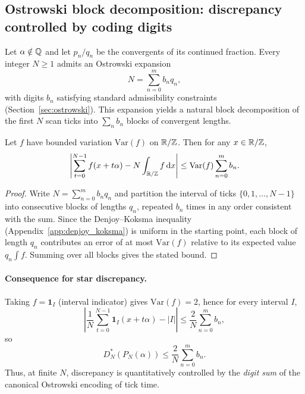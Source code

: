 \subsection{Ostrowski block decomposition: discrepancy controlled by coding digits}
\label{app:ostrowski_discrepancy}

Let $\alpha\notin\mathbb{Q}$ and let $p_n/q_n$ be the convergents of its continued fraction. Every integer $N\ge 1$ admits an Ostrowski expansion
\begin{equation}
N=\sum_{n=0}^{m} b_n q_n,
\end{equation}
with digits $b_n$ satisfying standard admissibility constraints (Section~\ref{sec:ostrowski}). This expansion yields a natural block decomposition of the first $N$ scan ticks into $\sum_n b_n$ blocks of convergent lengths.

\begin{proposition}
\label{prop:ostrowski_birkhoff_bound}
Let $f$ have bounded variation $\mathrm{Var}(f)$ on $\mathbb{R}/\mathbb{Z}$. Then for any $x\in\mathbb{R}/\mathbb{Z}$,
\begin{equation}
\left|\sum_{t=0}^{N-1} f(x+t\alpha) - N\int_{\mathbb{R}/\mathbb{Z}} f\,\mathrm{d} x\right|
\le \mathrm{Var}(f)\sum_{n=0}^{m} b_n.
\end{equation}
\end{proposition}

\begin{proof}
Write $N=\sum_{n=0}^{m} b_n q_n$ and partition the interval of ticks $\{0,1,\ldots,N-1\}$ into consecutive blocks of lengths $q_n$, repeated $b_n$ times in any order consistent with the sum.
Since the Denjoy--Koksma inequality (Appendix~\ref{app:denjoy_koksma}) is uniform in the starting point, each block of length $q_n$ contributes an error of at most $\mathrm{Var}(f)$ relative to its expected value $q_n\int f$.
Summing over all blocks gives the stated bound.
\end{proof}

\paragraph{Consequence for star discrepancy.}
Taking $f=\mathbf{1}_I$ (interval indicator) gives $\mathrm{Var}(f)=2$, hence for every interval $I$,
\begin{equation}
\left|\frac{1}{N}\sum_{t=0}^{N-1}\mathbf{1}_I(x+t\alpha)-|I|\right|
\le \frac{2}{N}\sum_{n=0}^{m} b_n,
\end{equation}
so
\begin{equation}
D_N^\ast\!\left(P_N(\alpha)\right)\le \frac{2}{N}\sum_{n=0}^{m} b_n.
\end{equation}
Thus, at finite $N$, discrepancy is quantitatively controlled by the \emph{digit sum} of the canonical Ostrowski encoding of tick time.

